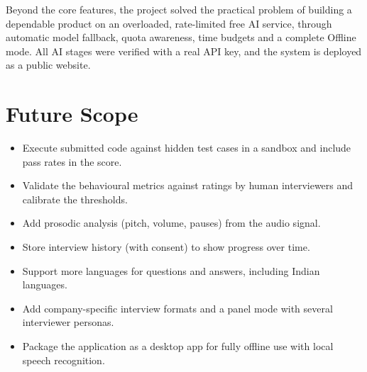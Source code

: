 \documentclass[12pt,a4paper,oneside]{report}
\begin{document}
Beyond the core features, the project solved the practical problem of building a dependable product on an overloaded, rate-limited free AI service, through automatic model fallback, quota awareness, time budgets and a complete Offline mode. All AI stages were verified with a real API key, and the system is deployed as a public website.

\section{Future Scope}
\begin{itemize}
  \item Execute submitted code against hidden test cases in a sandbox and include pass rates in the score.
  \item Validate the behavioural metrics against ratings by human interviewers and calibrate the thresholds.
  \item Add prosodic analysis (pitch, volume, pauses) from the audio signal.
  \item Store interview history (with consent) to show progress over time.
  \item Support more languages for questions and answers, including Indian languages.
  \item Add company-specific interview formats and a panel mode with several interviewer personas.
  \item Package the application as a desktop app for fully offline use with local speech recognition.
\end{itemize}
\end{document}
